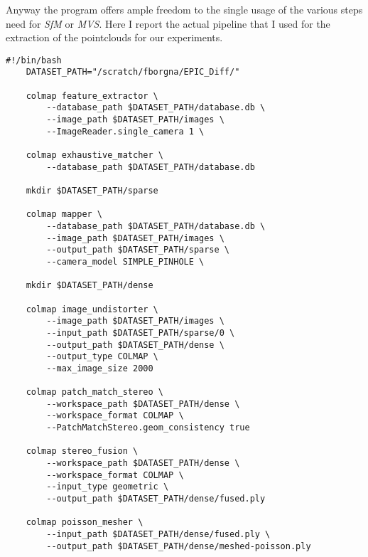 Anyway the program offers ample freedom to the single usage of the various steps
need for \textit{SfM} or \textit{MVS}. Here  I report the actual pipeline that
I used for the extraction of the pointclouds for our experiments.
\begin{lstlisting}[style=vscode, caption={COLMAP Single Commands}, label={lst:col}]
    #!/bin/bash
    DATASET_PATH="/scratch/fborgna/EPIC_Diff/"

    colmap feature_extractor \
        --database_path $DATASET_PATH/database.db \
        --image_path $DATASET_PATH/images \
        --ImageReader.single_camera 1 \
    
    colmap exhaustive_matcher \
        --database_path $DATASET_PATH/database.db

    mkdir $DATASET_PATH/sparse

    colmap mapper \
        --database_path $DATASET_PATH/database.db \
        --image_path $DATASET_PATH/images \
        --output_path $DATASET_PATH/sparse \
        --camera_model SIMPLE_PINHOLE \

    mkdir $DATASET_PATH/dense

    colmap image_undistorter \
        --image_path $DATASET_PATH/images \
        --input_path $DATASET_PATH/sparse/0 \
        --output_path $DATASET_PATH/dense \
        --output_type COLMAP \
        --max_image_size 2000
    
    colmap patch_match_stereo \
        --workspace_path $DATASET_PATH/dense \
        --workspace_format COLMAP \
        --PatchMatchStereo.geom_consistency true
    
    colmap stereo_fusion \
        --workspace_path $DATASET_PATH/dense \
        --workspace_format COLMAP \
        --input_type geometric \
        --output_path $DATASET_PATH/dense/fused.ply
    
    colmap poisson_mesher \
        --input_path $DATASET_PATH/dense/fused.ply \
        --output_path $DATASET_PATH/dense/meshed-poisson.ply

        \end{lstlisting}
    